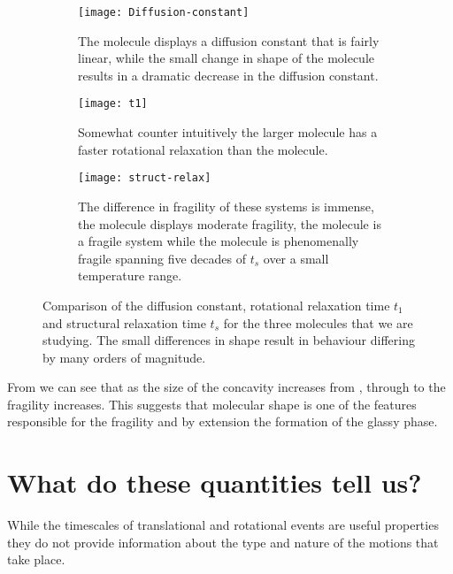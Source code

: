 \begin{figure}
    \centering
    \begin{subfigure}{0.6\linewidth}
        \texttt{[image: Diffusion-constant]}
        \caption{The \sone molecule displays a diffusion constant that is fairly linear, while the small change in shape of the \scon molecule results in a dramatic decrease in the diffusion constant.}
        \label{fig:diffusion constant}
    \end{subfigure}
    \begin{subfigure}{0.6\linewidth}
        \texttt{[image: t1]}
        \caption{Somewhat counter intuitively the larger \tri molecule has a faster rotational relaxation than the \scon molecule.}
        \label{fig:tau1}
    \end{subfigure}
    \begin{subfigure}{0.6\textwidth}
        \texttt{[image: struct-relax]}
        \caption{The difference in fragility of these systems is immense, the \sone molecule displays moderate fragility, the \tri molecule is a fragile system while the \scon molecule is phenomenally fragile spanning five decades of $t_s$ over a small temperature range.}
        \label{fig:struct relax}
    \end{subfigure}
    \caption{Comparison of the diffusion constant, rotational relaxation time $t_1$ and structural relaxation time $t_s$ for the three molecules that we are studying. The small differences in shape result in behaviour differing by many orders of magnitude.}
    \label{fig:dynamic comparison}
\end{figure}

From  we can see that as the size of the concavity increases from \sone, through \scon to \tri the fragility increases. This suggests that molecular shape is one of the features responsible for the fragility and by extension the formation of the glassy phase.

\section{What do these quantities tell us?}

While the timescales of translational and rotational events are useful properties they do not provide information about the type and nature of the motions that take place.

